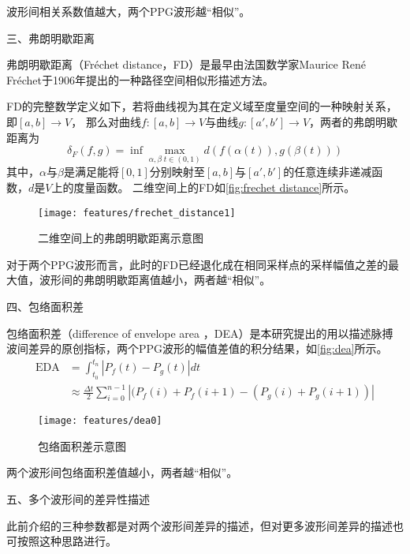 波形间相关系数值越大，两个PPG波形越“相似”。

三、弗朗明歇距离

弗朗明歇距离（Fréchet distance，FD）是最早由法国数学家Maurice René Fréchet于1906年提出的一种路径空间相似形描述方法\cite{Wien1994,Kaveh2013,GN2017,derohde2022}。

FD的完整数学定义如下，若将曲线视为其在定义域至度量空间的一种映射关系，即$[a,b]\rightarrow V$，
那么对曲线$f:[a,b]\rightarrow V$与曲线$g:[a',b']\rightarrow V$，两者的弗朗明歇距离为
\begin{equation}
    \label{equ:frechet distance}
    \delta_F(f,g)=\inf \max \limits_{\alpha,\beta \; t \in (0,1)} d(f(\alpha(t)), g(\beta(t)))
\end{equation}
其中，$\alpha$与$\beta$是满足能将$[0,1]$分别映射至$[a,b]$与$[a',b']$的任意连续非递减函数，$d$是$V$上的度量函数\cite{Wien1994}。
二维空间上的FD如\autoref{fig:frechet distance}所示。
\begin{figure}[htbp]
    \centering
    \texttt{[image: features/frechet\_distance1]}
    \caption{\label{fig:frechet distance}二维空间上的弗朗明歇距离示意图}
\end{figure}

对于两个PPG波形而言，此时的FD已经退化成在相同采样点的采样幅值之差的最大值，波形间的弗朗明歇距离值越小，两者越“相似”。

四、包络面积差

包络面积差（difference of envelope area ，DEA）是本研究提出的用以描述脉搏波间差异的原创指标，两个PPG波形的幅值差值的积分结果，如\autoref{fig:dea}所示。
\begin{equation}
    \label{equ:dea}
    \begin{aligned}
        \text{EDA} &= \int_{t_0}^{t_n}|P_f(t)-P_g(t)|dt\\
        &\approx \frac{\Delta t}{2} \sum_{i=0}^{n-1}{|(P_f(i)+P_f(i+1)-(P_g(i)+P_g(i+1))|}
    \end{aligned}
\end{equation}
\begin{figure}[htbp]
    \centering
    \texttt{[image: features/dea0]}
    \caption[包络面积差示意图]{\label{fig:dea}包络面积差示意图}
\end{figure}

两个波形间包络面积差值越小，两者越“相似”。

五、多个波形间的差异性描述

此前介绍的三种参数都是对两个波形间差异的描述，但对更多波形间差异的描述也可按照这种思路进行。

